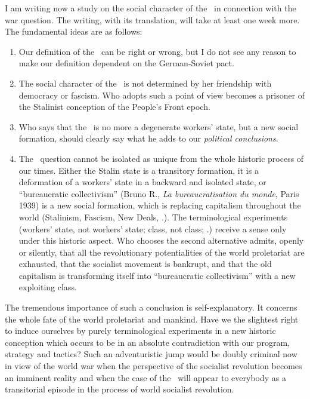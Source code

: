 

\noindent
I am writing
now a study on the social character of the \USSR\ in connection with the war question. The writing, with its translation, will take at least one week more. The fundamental ideas are as follows:

\begin{enumerate}
	\item Our definition of the \USSR\ can be right or wrong, but I do not see any reason to make our definition dependent on the German-Soviet pact.
	
	\item The social character of the \USSR\ is not determined by her friendship with democracy or fascism. Who adopts such a point of view becomes a prisoner of the Stalinist conception of the People’s Front epoch.
	
	\item Who says that the \USSR\ is no more a degenerate workers’ state, but a new social formation, should clearly say what he adds to our \emph{political conclusions}.
	
	\item The \USSR\ question cannot be isolated as unique from the whole historic process of our times. Either the Stalin state is a transitory formation, it is a deformation of a workers’ state in a backward and isolated state, or “bureaucratic collectivism” (Bruno R., \emph{La bureaucratisation du monde}, Paris 1939) is a new social formation, which is replacing capitalism throughout the world (Stalinism, Fascism, New Deals, \etc.). The terminological experiments (workers’ state, not workers’ state; class, not class; \etc.) receive a sense only under this historic aspect. Who chooses the second alternative admits, openly or silently, that all the revolutionary potentialities of the world proletariat are exhausted, that the socialist movement is bankrupt, and that the old capitalism is transforming itself into “bureaucratic collectivism” with a new exploiting class.
\end{enumerate}

The tremendous importance of such a conclusion is self-expla\-na\-tory. It concerns the whole fate of the world proletariat and man\-kind. Have we the slightest right to induce ourselves by purely terminological experiments in a new historic conception which occurs to be in an absolute contradiction with our program, strategy and tactics? Such an adventuristic jump would be doubly criminal now in view of the world war when the perspective of the socialist revolution becomes an imminent reality and when the case of the \USSR\ will appear to everybody as a transitorial episode in the process of world socialist revolution.

